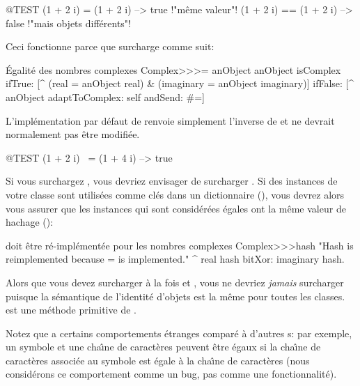 \documentclass[a4paper,10pt,twoside]{book}
\begin{document}
\begin{code}{@TEST}
(1 + 2 i) = (1 + 2 i)   --> true     !"m\^eme valeur"!
(1 + 2 i) == (1 + 2 i)  --> false    !"mais objets diff\'erents"!
\end{code}

Ceci fonctionne parce que  surcharge \ct{=} comme suit:

\begin{method}{\'Egalit\'e des nombres complexes}
Complex>>>= anObject
    anObject isComplex
        ifTrue: [^ (real = anObject real) & (imaginary = anObject imaginary)]
        ifFalse: [^ anObject adaptToComplex: self andSend: #=]
\end{method}

L'impl\'ementation par d\'efaut de  renvoie simplement l'inverse de  et ne devrait normalement pas \^etre modifi\'ee.

\begin{code}{@TEST}
(1 + 2 i) ~= (1 + 4 i) --> true
\end{code}

Si vous surchargez \ct{=}, vous devriez envisager de surcharger
. Si des instances de votre classe sont
utilis\'ees comme cl\'es dans un dictionnaire (),
vous devrez alors vous assurer que les instances qui sont
consid\'er\'ees \'egales ont la m\^eme valeur de hachage ():

\begin{method}{ doit \^etre r\'e-impl\'ement\'ee pour les nombres complexes}
Complex>>>hash
    "Hash is reimplemented because = is implemented."
    ^ real hash bitXor: imaginary hash.
\end{method}

Alors que vous devez surcharger \`a la fois \ct{=} et , vous
ne devriez \emph{jamais} surcharger \ct{==} puisque la s\'emantique de l'identit\'e d'objets est la m\^eme pour toutes les classes.  \ct{==} est une m\'ethode primitive de .

Notez que \sq a certains comportements \'etranges compar\'e \`a d'autres \st{}s: par exemple, un symbole et une cha\^{\i}ne de caract\`eres peuvent \^etre \'egaux si la cha\^{\i}ne de caract\`eres associ\'ee au symbole est \'egale \`a la cha\^{\i}ne de caract\`eres (nous consid\'erons ce comportement comme un bug, pas comme une fonctionnalit\'e).
\end{document}
